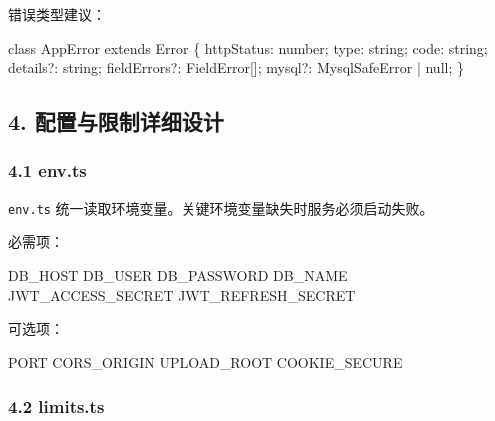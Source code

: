 \documentclass[
  a4paper,
  UTF8]{ctexart}
\newenvironment{Shaded}{}{}
\newcommand{\DataTypeTok}[1]{\textcolor[rgb]{0.56,0.13,0.00}{#1}}
\newcommand{\NormalTok}[1]{#1}
\newcommand{\OperatorTok}[1]{\textcolor[rgb]{0.40,0.40,0.40}{#1}}
\begin{document}
错误类型建议：

\begin{Shaded}
\begin{Highlighting}[]
\NormalTok{class AppError extends Error \{}
\NormalTok{  httpStatus}\OperatorTok{:} \DataTypeTok{number}\OperatorTok{;}
\NormalTok{  type}\OperatorTok{:} \DataTypeTok{string}\OperatorTok{;}
\NormalTok{  code}\OperatorTok{:} \DataTypeTok{string}\OperatorTok{;}
\NormalTok{  details}\OperatorTok{?:} \DataTypeTok{string}\OperatorTok{;}
\NormalTok{  fieldErrors}\OperatorTok{?:}\NormalTok{ FieldError[]}\OperatorTok{;}
\NormalTok{  mysql}\OperatorTok{?:}\NormalTok{ MysqlSafeError }\OperatorTok{|} \DataTypeTok{null}\OperatorTok{;}
\NormalTok{\}}
\end{Highlighting}
\end{Shaded}

\hypertarget{ux914dux7f6eux4e0eux9650ux5236ux8be6ux7ec6ux8bbeux8ba1}{%
\subsection{4.
配置与限制详细设计}\label{ux914dux7f6eux4e0eux9650ux5236ux8be6ux7ec6ux8bbeux8ba1}}

\hypertarget{env.ts}{%
\subsubsection{4.1 env.ts}\label{env.ts}}

\texttt{env.ts} 统一读取环境变量。关键环境变量缺失时服务必须启动失败。

必需项：

\begin{Shaded}
\begin{Highlighting}[]
\NormalTok{DB\_HOST}
\NormalTok{DB\_USER}
\NormalTok{DB\_PASSWORD}
\NormalTok{DB\_NAME}
\NormalTok{JWT\_ACCESS\_SECRET}
\NormalTok{JWT\_REFRESH\_SECRET}
\end{Highlighting}
\end{Shaded}

可选项：

\begin{Shaded}
\begin{Highlighting}[]
\NormalTok{PORT}
\NormalTok{CORS\_ORIGIN}
\NormalTok{UPLOAD\_ROOT}
\NormalTok{COOKIE\_SECURE}
\end{Highlighting}
\end{Shaded}

\hypertarget{limits.ts}{%
\subsubsection{4.2 limits.ts}\label{limits.ts}}
\end{document}
